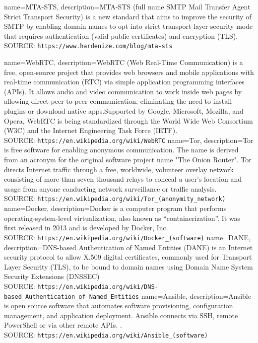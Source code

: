 {
	name=MTA-STS,
	description={MTA-STS (full name SMTP Mail Transfer Agent Strict Transport Security) is a new standard that aims to improve the security of SMTP by enabling domain names to opt into strict transport layer security mode that requires authentication (valid public certificates) and encryption (TLS).\\SOURCE: \texttt{https://www.hardenize.com/blog/mta-sts}}
}


{
	name=WebRTC,
	description={WebRTC (Web Real-Time Communication) is a free, open-source project that provides web browsers and mobile applications with real-time communication (RTC) via simple application programming interfaces (APIs). It allows audio and video communication to work inside web pages by allowing direct peer-to-peer communication, eliminating the need to install plugins or download native apps.Supported by Google, Microsoft, Mozilla, and Opera, WebRTC is being standardized through the World Wide Web Consortium (W3C) and the Internet Engineering Task Force (IETF).\\SOURCE: \texttt{https://en.wikipedia.org/wiki/WebRTC}}
}
{
	name=Tor,
	description={Tor is free software for enabling anonymous communication. The name is derived from an acronym for the original software project name "The Onion Router". Tor directs Internet traffic through a free, worldwide, volunteer overlay network consisting of more than seven thousand relays to conceal a user's location and usage from anyone conducting network surveillance or traffic analysis.  \\SOURCE: \texttt{https://en.wikipedia.org/wiki/Tor\_(anonymity\_network)}}
}
{
	name=Docker,
	description={Docker is a computer program that performs operating-system-level virtualization, also known as ``containerization''. It was first released in 2013 and is developed by Docker, Inc. \\SOURCE: \texttt{https://en.wikipedia.org/wiki/Docker\_(software)}}
}
{
	name=DANE,
	description={DNS-based Authentication of Named Entities (DANE) is an Internet security protocol to allow X.509 digital certificates, commonly used for Transport Layer Security (TLS), to be bound to domain names using Domain Name System Security Extensions (DNSSEC) \\SOURCE: \texttt{https://en.wikipedia.org/wiki/DNS-based\_Authentication\_of\_Named\_Entities}}
}
{
	name=Ansible,
	description={Ansible is open source software that automates software provisioning, configuration management, and application deployment. Ansible connects via SSH, remote PowerShell or via other remote APIs. . \\SOURCE: \texttt{https://en.wikipedia.org/wiki/Ansible\_(software)}}
}

